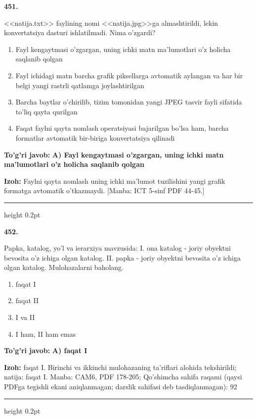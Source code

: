 \documentclass[10pt,a4paper]{article}
\begin{document}
{\bfseries\sffamily\color{ink} 451.}
\par
<<natija.txt>> faylining nomi <<natija.jpg>>ga almashtirildi, lekin konvertatsiya dasturi ishlatilmadi. Nima o'zgardi?
\begin{enumerate}[label=\Alph*),leftmargin=9mm]
\item Fayl kengaytmasi o'zgargan, uning ichki matn ma'lumotlari o'z holicha saqlanib qolgan
\item Fayl ichidagi matn barcha grafik piksellarga avtomatik aylangan va har bir belgi yangi rastrli qatlamga joylashtirilgan
\item Barcha baytlar o'chirilib, tizim tomonidan yangi JPEG tasvir fayli sifatida to'liq qayta qurilgan
\item Faqat faylni qayta nomlash operatsiyasi bajarilgan bo'lsa ham, barcha formatlar avtomatik bir-biriga konvertatsiya qilinadi
\end{enumerate}
\begin{tcolorbox}[enhanced,breakable,colback=teal!4,colframe=teal!60!black,boxrule=0.45pt,arc=1.2mm,left=2.7mm,right=2.7mm,top=1.8mm,bottom=1.8mm,before skip=2mm,after skip=2mm]
{\bfseries\sffamily\color{teal}To'g'ri javob:} \textbf{A) Fayl kengaytmasi o'zgargan, uning ichki matn ma'lumotlari o'z holicha saqlanib qolgan}
\par\smallskip
{\bfseries Izoh:} Faylni qayta nomlash uning ichki ma'lumot tuzilishini yangi grafik formatga avtomatik o'tkazmaydi. [Manba: ICT 5-sinf PDF 44-45.]
\end{tcolorbox}
\vspace{2mm}\hrule height 0.2pt\vspace{3mm}

{\bfseries\sffamily\color{ink} 452.}
\par
Papka, katalog, yo'l va ierarxiya mavzusida: I. ona katalog - joriy obyektni bevosita o'z ichiga olgan katalog. II. papka - joriy obyektni bevosita o'z ichiga olgan katalog. Mulohazalarni baholang.
\begin{enumerate}[label=\Alph*),leftmargin=9mm]
\item faqat I
\item faqat II
\item I va II
\item I ham, II ham emas
\end{enumerate}
\begin{tcolorbox}[enhanced,breakable,colback=teal!4,colframe=teal!60!black,boxrule=0.45pt,arc=1.2mm,left=2.7mm,right=2.7mm,top=1.8mm,bottom=1.8mm,before skip=2mm,after skip=2mm]
{\bfseries\sffamily\color{teal}To'g'ri javob:} \textbf{A) faqat I}
\par\smallskip
{\bfseries Izoh:} faqat I. Birinchi va ikkinchi mulohazaning ta'riflari alohida tekshirildi; natija: faqat I. Manba: CAM6, PDF 178-205; Qo'shimcha sahifa raqami (qaysi PDFga tegishli ekani aniqlanmagan; darslik sahifasi deb tasdiqlanmagan): 92
\end{tcolorbox}
\vspace{2mm}\hrule height 0.2pt\vspace{3mm}
\end{document}
